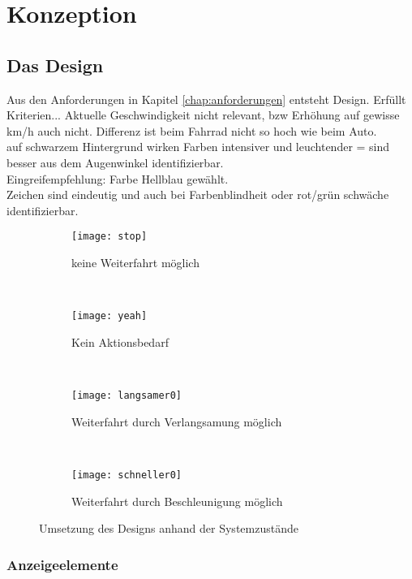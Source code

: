 \chapter{\label{chap:entwurf}Konzeption}
\section{Das Design}
Aus den Anforderungen in Kapitel \ref{chap:anforderungen} entsteht Design. Erfüllt Kriterien... Aktuelle Geschwindigkeit nicht relevant, bzw Erhöhung auf gewisse km/h auch nicht. Differenz ist beim Fahrrad nicht so hoch wie beim Auto.\\
auf schwarzem Hintergrund wirken Farben intensiver und leuchtender = sind besser aus dem Augenwinkel identifizierbar.\\
Eingreifempfehlung: Farbe Hellblau gewählt.\\
Zeichen sind eindeutig und auch bei Farbenblindheit oder rot/grün schwäche identifizierbar.
\begin{figure}[H]
        \centering
           \begin{subfigure}[t]{0.23\textwidth}
                \texttt{[image: stop]}
                \caption[Systemzustand d]{keine Weiterfahrt möglich}
                \label{fig:stop}
        \end{subfigure}
           ~ 
              \begin{subfigure}[t]{0.23\textwidth}
                \texttt{[image: yeah]}
                \caption[Systemzustand c]{Kein Aktionsbedarf}
                \label{fig:yeah}
        \end{subfigure}
           ~
        \begin{subfigure}[t]{0.23\textwidth}
                \texttt{[image: langsamer0]}
                \caption[Systemzustand a]{Weiterfahrt durch Verlangsamung  möglich}
                \label{fig:langsamer}
        \end{subfigure}
        ~
        \begin{subfigure}[t]{0.23\textwidth}
                \texttt{[image: schneller0]}
                \caption[Systemzustand b]{Weiterfahrt durch Beschleunigung möglich}
                \label{fig:schneller}
        \end{subfigure}     
        \caption[Systemzustände im Ampelbereich]{Umsetzung des Designs anhand der Systemzustände}
        \label{fig:mockup}
\end{figure} 
\subsection{Anzeigeelemente}
